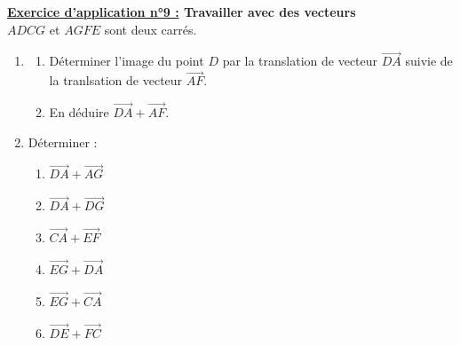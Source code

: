 \documentclass[12pt]{article}
\begin{document}
\begin{mdframed}[
    linewidth=1pt,
    roundcorner=5pt,
    linecolor=RoyalBlue,
    innertopmargin=10pt,
    innerbottommargin=10pt
]
{\color{RoyalBlue}\textbf{\underline{Exercice d'application n°9 :} Travailler avec des vecteurs}
\vspace{5pt}
}
\\$ADCG$ et $AGFE$ sont deux carrés.
\\
\begin{minipage}[t]{.45\textwidth}%
    \vspace{0pt}
    \begin{enumerate}
        \item 
            \begin{enumerate}
                \item Déterminer l'image du point $D$ par la translation de vecteur $\overrightarrow{DA}$ suivie de la 
                tranlsation de vecteur $\overrightarrow{AF}$.
                \item En déduire $\overrightarrow{DA} + \overrightarrow{AF}$.
            \end{enumerate}
        \item Déterminer :
        \begin{enumerate}
            \item $\overrightarrow{DA} + \overrightarrow{AG}$
            \item $\overrightarrow{DA} + \overrightarrow{DG}$
            \item $\overrightarrow{CA} + \overrightarrow{EF}$
            \item $\overrightarrow{EG} + \overrightarrow{DA}$
            \item $\overrightarrow{EG} + \overrightarrow{CA}$
            \item $\overrightarrow{DE} + \overrightarrow{FC}$
        \end{enumerate}
    \end{enumerate}
\end{minipage}%
\hfill
\begin{minipage}[t]{.45\textwidth}%
    \vspace{20pt}
\end{minipage}
\end{mdframed}
\end{document}
